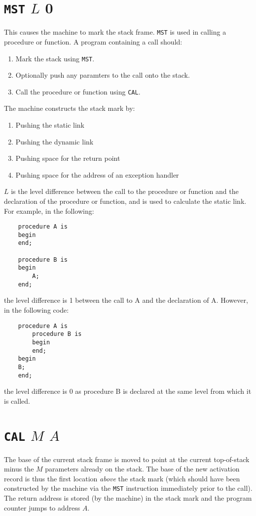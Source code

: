 \documentclass[a4paper,10pt]{report}
\begin{document}
\section{\texttt{MST} $L$ 0}
This causes the machine to mark the stack frame.  \texttt{MST} is used
in calling a procedure or function.  A program containing a call
should:
\begin{enumerate}
\item Mark the stack using \texttt{MST}.
\item Optionally push any paramters to the call onto the stack.
\item Call the procedure or function using \texttt{CAL}.
\end{enumerate}
The machine constructs the stack mark by:
\begin{enumerate}
\item Pushing the static link
\item Pushing the dynamic link
\item Pushing space for the return point
\item Pushing space for the address of an exception handler
\end{enumerate}

$L$ is the level difference between the call to the procedure or
function and the declaration of the procedure or function, and is used
to calculate the static link.  For example, in the following:
\begin{verbatim}
    procedure A is
    begin
    end;

    procedure B is
    begin
        A;
    end;
\end{verbatim}
the level difference is 1 between the call to A and the declaration of
A.  However, in the following code:
\begin{verbatim}
    procedure A is
        procedure B is
        begin
        end;
    begin
    B;
    end;
\end{verbatim}
the level difference is 0 as procedure B is declared at the same level
from which it is called.

\section{\texttt{CAL} $M$ $A$}
The base of the current stack frame is moved to point at the current
top-of-stack minus the $M$ parameters already on the stack.  The base
of the new activation record is thus the first location \emph{above}
the stack mark (which should have been constructed by the machine via
the \texttt{MST} instruction immediately prior to the call).  The
return address is stored (by the machine) in the stack mark and the
program counter jumps to address $A$.
\end{document}
